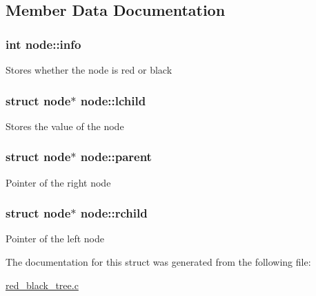 \subsection{Member Data Documentation}
\hypertarget{structnode_ac8973feda870a119ccdc25910254db0c}{
\subsubsection[{info}]{\setlength{\rightskip}{0pt plus 5cm}int node\+::info}}\label{structnode_ac8973feda870a119ccdc25910254db0c}
Stores whether the node is red or black \hypertarget{structnode_a5e9a6db5c18bb131ca4b72a1ff575ad8}{
\subsubsection[{lchild}]{\setlength{\rightskip}{0pt plus 5cm}struct {\bf node}$\ast$ node\+::lchild}}\label{structnode_a5e9a6db5c18bb131ca4b72a1ff575ad8}
Stores the value of the node \hypertarget{structnode_a05e4fe9e0177ba2d8dbd2c487cfddd53}{
\subsubsection[{parent}]{\setlength{\rightskip}{0pt plus 5cm}struct {\bf node}$\ast$ node\+::parent}}\label{structnode_a05e4fe9e0177ba2d8dbd2c487cfddd53}
Pointer of the right node \hypertarget{structnode_aa1ed9628cfc90de6f68ff88ddf9350fa}{
\subsubsection[{rchild}]{\setlength{\rightskip}{0pt plus 5cm}struct {\bf node}$\ast$ node\+::rchild}}\label{structnode_aa1ed9628cfc90de6f68ff88ddf9350fa}
Pointer of the left node 

The documentation for this struct was generated from the following file\+:\begin{DoxyCompactItemize}
\item 
\hyperlink{red__black__tree_8c}{red\+\_\+black\+\_\+tree.\+c}\end{DoxyCompactItemize}
